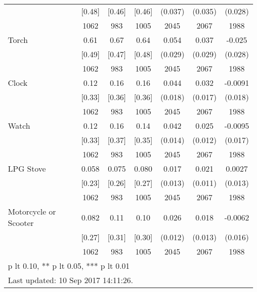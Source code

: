 \begin{table}[htbp]
\begin{tabular*}{1\hsize}{@{\hskip\tabcolsep\extracolsep\fill}l*{1}{cccccc}}
                                &   [0.48]&   [0.46]&   [0.46]&  (0.037)         &  (0.035)         &  (0.028)         \\
                                &     1062&      983&     1005&     2045         &     2067         &     1988         \\
Torch                           &     0.61&     0.67&     0.64&    0.054\sym{*}  &    0.037         &   -0.025         \\
                                &   [0.49]&   [0.47]&   [0.48]&  (0.029)         &  (0.029)         &  (0.028)         \\
                                &     1062&      983&     1005&     2045         &     2067         &     1988         \\
Clock                           &     0.12&     0.16&     0.16&    0.044\sym{**} &    0.032\sym{*}  &  -0.0091         \\
                                &   [0.33]&   [0.36]&   [0.36]&  (0.018)         &  (0.017)         &  (0.018)         \\
                                &     1062&      983&     1005&     2045         &     2067         &     1988         \\
Watch                           &     0.12&     0.16&     0.14&    0.042\sym{***}&    0.025\sym{**} &  -0.0095         \\
                                &   [0.33]&   [0.37]&   [0.35]&  (0.014)         &  (0.012)         &  (0.017)         \\
                                &     1062&      983&     1005&     2045         &     2067         &     1988         \\
LPG Stove                       &    0.058&    0.075&    0.080&    0.017         &    0.021\sym{*}  &   0.0027         \\
                                &   [0.23]&   [0.26]&   [0.27]&  (0.013)         &  (0.011)         &  (0.013)         \\
                                &     1062&      983&     1005&     2045         &     2067         &     1988         \\
Motorcycle or Scooter           &    0.082&     0.11&     0.10&    0.026\sym{**} &    0.018         &  -0.0062         \\
                                &   [0.27]&   [0.31]&   [0.30]&  (0.012)         &  (0.013)         &  (0.016)         \\
                                &     1062&      983&     1005&     2045         &     2067         &     1988         \\
\bottomrule
\multicolumn{7}{l}{\footnotesize * p lt 0.10, ** p lt 0.05, *** p lt 0.01}\\
\multicolumn{7}{l}{\footnotesize Last updated: 10 Sep 2017 14:11:26.}\\
\end{tabular*}
\end{table}
